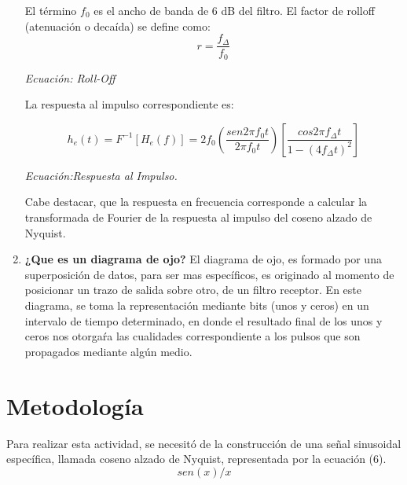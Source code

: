 \documentclass[lettersize,journal]{IEEEtran}
\begin{document}
\begin{enumerate}
El término $f_{0}$ es el ancho de banda de 6 dB del filtro. El factor de rolloff (atenuación o decaída) se define como:
\begin{equation}
    r = \frac{f_{\Delta}}{f_{0}}
\end{equation}
\begin{center}
    \textit{Ecuación: Roll-Off}
\end{center}

La respuesta al impulso correspondiente es:

\begin{equation}
    h_{e}(t)=F^{-1}[H_{e}(f)]=2f_{0}(\frac{sen2\pi f_{0}t}{2\pi f_{0}t})[\frac{cos2\pi f_{\Delta}t}{1-(4 f_{\Delta}t)^2}]
\end{equation}
\begin{center}
    \textit{Ecuación:Respuesta al Impulso. }
\end{center}

Cabe destacar, que la respuesta en frecuencia corresponde a calcular la transformada de Fourier de la respuesta al impulso del coseno alzado de Nyquist. 
\newline
    \item \textbf{¿Que es un diagrama de ojo?} \newline \newline
       El diagrama de ojo, es formado por una superposición de datos, para ser mas específicos, es originado al momento de posicionar un trazo de salida sobre otro,  de un filtro receptor. En este diagrama, se toma la representación mediante bits (unos y ceros) en un intervalo de tiempo determinado, en donde el resultado final de los unos y ceros nos otorgaŕa las cualidades correspondiente a los pulsos que son propagados mediante algún medio.
\end{enumerate}

\section{Metodología}\label{sec:metodologia} 
Para realizar esta actividad, se necesitó de la construcción de una señal sinusoidal específica, llamada coseno alzado de Nyquist, representada por la ecuación (6). 
\begin{equation} sen(x)/x\end{equation} 
\end{document}
